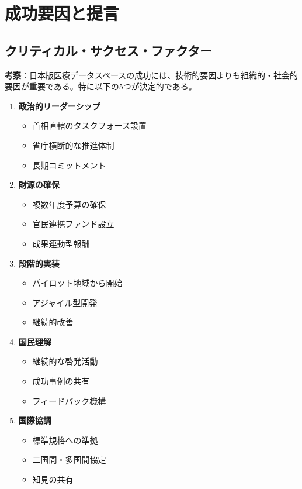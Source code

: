 \documentclass[
  a4paper,
  a4paper,
  11pt]{ltjsbook}
\providecommand{\tightlist}{%
  \setlength{\itemsep}{0pt}\setlength{\parskip}{0pt}}
\begin{document}
\section{成功要因と提言}\label{ux6210ux529fux8981ux56e0ux3068ux63d0ux8a00}

\subsection{クリティカル・サクセス・ファクター}\label{ux30afux30eaux30c6ux30a3ux30abux30ebux30b5ux30afux30bbux30b9ux30d5ux30a1ux30afux30bfux30fc}

\textbf{考察}：日本版医療データスペースの成功には、技術的要因よりも組織的・社会的要因が重要である。特に以下の5つが決定的である。

\begin{enumerate}
\def\labelenumi{\arabic{enumi}.}
\tightlist
\item
  \textbf{政治的リーダーシップ}

  \begin{itemize}
  \tightlist
  \item
    首相直轄のタスクフォース設置
  \item
    省庁横断的な推進体制
  \item
    長期コミットメント
  \end{itemize}
\item
  \textbf{財源の確保}

  \begin{itemize}
  \tightlist
  \item
    複数年度予算の確保
  \item
    官民連携ファンド設立
  \item
    成果連動型報酬
  \end{itemize}
\item
  \textbf{段階的実装}

  \begin{itemize}
  \tightlist
  \item
    パイロット地域から開始
  \item
    アジャイル型開発
  \item
    継続的改善
  \end{itemize}
\item
  \textbf{国民理解}

  \begin{itemize}
  \tightlist
  \item
    継続的な啓発活動
  \item
    成功事例の共有
  \item
    フィードバック機構
  \end{itemize}
\item
  \textbf{国際協調}

  \begin{itemize}
  \tightlist
  \item
    標準規格への準拠
  \item
    二国間・多国間協定
  \item
    知見の共有
  \end{itemize}
\end{enumerate}
\end{document}

